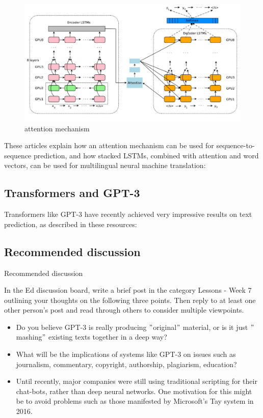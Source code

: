 \documentclass[11pt]{article}
\begin{document}
\begin{figure}[h]
    \centering
    \includegraphics[]{../out/images/attention-mechanism}
    \caption[attention mechanism]{attention mechanism}
    \label{fig:attention mechanism}
\end{figure}

These articles explain how an attention mechanism can be used for
sequence-to-sequence prediction, and how stacked LSTMs, combined with attention
and word vectors, can be used for multilingual neural machine translation:

\subsection{Transformers and GPT-3}\label{subsec:transformers-and-gpt-3}
Transformers like GPT-3 have recently achieved very impressive results on text
prediction, as described in these resources:

\subsection{Recommended discussion}\label{subsec:recommended-discussion}
Recommended discussion

In the Ed discussion board, write a brief post in the category Lessons - Week 7
outlining your thoughts on the following three points.
Then reply to at least one other person's post and read through others to
consider multiple viewpoints.
\begin{itemize}
  \item Do you believe GPT-3 is really producing \("\)original\("\) material, or is it just \("\)mashing\("\) existing texts together in a deep way?
  \item What will be the implications of systems like GPT-3 on issues such as journalism, commentary, copyright, authorship, plagiarism, education?
  \item Until recently, major companies were still using traditional scripting for their chat-bots, rather than deep neural networks. One motivation for this might be to avoid problems such as those manifested by Microsoft's Tay system in 2016.
\end{itemize}
\end{document}
